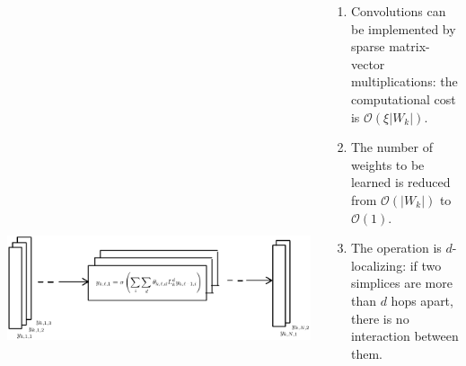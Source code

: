 \documentclass[landscape,a0paper,blockverticalspace = 5mm]{tikzposter}
\begin{document}
\begin{columns}
{{%
\vspace{-0.8cm}
    \begin{center}
          \includegraphics[height=17.5cm]{figures/snns_figure.pdf}
          \end{center}

\begin{enumerate}
\vspace{-1.4cm}
\item Convolutions can be implemented by sparse matrix-vector multiplications: the computational cost is $\mathcal{O}(\xi\lvert W_k\rvert)$.
\item The number of weights to be learned is reduced from $\mathcal{O}(\lvert W_k\rvert)$ to $\mathcal{O}(1)$.
\item The operation is $d$-localizing: if two simplices are more than $d$ hops apart, there is no interaction between them.
\end{enumerate}
\vspace{-0.8cm}
}




}
\end{columns}
\end{document}
